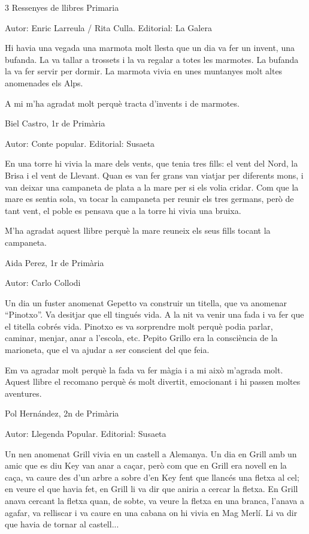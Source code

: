\begin{shortnews}
{3} %
{Ressenyes de llibres}
{}
{Primaria}

{
Autor: Enric Larreula / Rita Culla.   Editorial: La Galera 


Hi havia una vegada una marmota molt llesta que un dia va fer un invent, una bufanda. La va tallar a trossets i la va regalar a totes les marmotes. La bufanda la va fer servir per dormir. La marmota vivia en unes muntanyes molt altes anomenades els Alps.

A mi m’ha agradat molt perquè tracta d’invents i de marmotes.
									
Biel Castro, 1r de Primària
}

{
Autor: Conte popular.   Editorial: Susaeta

En una torre hi vivia la mare dels vents, que tenia tres fills: el vent del Nord, la Brisa i el vent de Llevant. Quan es van fer grans van viatjar per diferents mons, i van deixar una campaneta de plata a la mare per si els volia cridar.  Com que la mare es sentia sola, va tocar la campaneta per reunir els tres germans, però de tant vent, el poble es pensava que a la torre hi vivia una bruixa.

M’ha agradat aquest llibre perquè la mare reuneix els seus fills tocant la campaneta.
									
Aida Perez, 1r de Primària
}

{
Autor: Carlo Collodi      

Un dia un fuster anomenat Gepetto va construir un titella, que va anomenar  “Pinotxo”. Va desitjar que  ell tingués vida. A la nit va venir una fada i va fer que el titella cobrés vida. Pinotxo es va sorprendre molt perquè podia parlar, caminar, menjar, anar a l’escola, etc. Pepito Grillo era la consciència de la marioneta, que el va ajudar a ser conscient del que feia. 

Em va agradar molt perquè la fada va fer màgia i a mi això m’agrada molt. Aquest llibre el recomano perquè és molt divertit, emocionant i hi passen moltes aventures.

Pol Hernández,  2n de Primària
}

{
Autor: Llegenda Popular.    Editorial: Susaeta  

Un nen anomenat Grill vivia en un castell a Alemanya. Un dia en Grill amb un amic que es diu Key van anar a caçar, però com que en Grill era novell  en la caça, va caure des d’un arbre a sobre d’en Key fent que llancés una fletxa al cel; en veure el que havia fet, en Grill li va dir que aniria a cercar la fletxa. En Grill anava cercant la fletxa quan, de sobte, va veure la fletxa en una branca, l’anava a agafar,  va relliscar i va caure en una cabana on hi vivia en Mag Merlí.  Li va dir que havia de  tornar al castell...    

}
\end{shortnews}
